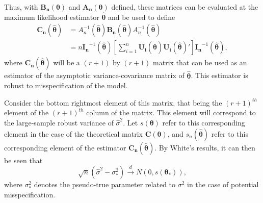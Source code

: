 \documentclass[sn-mathphys-ay]{sn-jnl}
\begin{document}
		Thus, with $\bm{B_n}(\bm{\theta})$ and $\bm{A_n}(\bm{\theta})$ defined, these matrices can be evaluated at the maximum likelihood estimator $\hat{\bm{\theta}}$ and be used to define
		\begin{equation*}
			\begin{split}
				\bm{C_n}(\hat{\bm{\theta}}) & = A^{-1}_n(\hat{\bm{\theta}}) \bm{B_n}(\hat{\bm{\theta}}) A^{-1}_n(\hat{\bm{\theta}}) \\
				& = n \bm{I_n}^{-1}(\hat{\bm{\theta}}) \left[ \sum_{i=1}^{n} \bm{U_i}(\hat{\bm{\theta}}) \bm{U_i}(\hat{\bm{\theta}})' \right] \bm{I_n}^{-1}(\hat{\bm{\theta}}) ,
			\end{split}
		\end{equation*}
		where $\bm{C_n}(\hat{\bm{\theta}})$ will be a $(r+1)$ by $(r+1)$ matrix that can be used as an estimator of the asymptotic variance-covariance matrix of $\hat{\bm{\theta}}$. This estimator is robust to misspecification
		of the model.
		
		Consider the bottom rightmost element of this matrix, that being the $(r+1)^{th}$ element of the $(r+1)^{th}$ column of the matrix. This element will correspond to the large-sample
		robust variance of $\hat{\sigma}^2$. Let $s(\bm{\theta})$ refer to this corresponding element in the case of the theoretical matrix $\bm{C}(\bm{\theta})$, and $s_n(\hat{\bm{\theta}})$ refer to this
		corresponding element of the estimator $\bm{C_n}(\hat{\bm{\theta}})$. By White's results, it can then be seen that
		\begin{equation}
			\sqrt{n} (\hat{\sigma}^2 - \sigma_*^2) \xrightarrow[]{d} N(0, s(\bm{\theta}_*)) ,
		\end{equation}
		where $\sigma_*^2$ denotes the pseudo-true parameter related to $\sigma^2$ in the case of potential misspecification.
\end{document}
